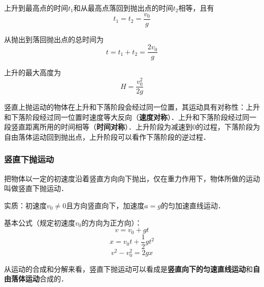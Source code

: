 上升到最高点的时间$t_1$和从最高点落回到抛出点的时间$t_2$相等，且有
\begin{equation}
t_1=t_2=\frac{v_0}{g}
\end{equation}

从抛出到落回抛出点的总时间为
\begin{equation}
t=t_1+t_2=\frac{2v_0}{g}
\end{equation}

上升的最大高度为
\begin{equation}
H=\frac{v_0^2}{2g}
\end{equation}

竖直上抛运动的物体在上升和下落阶段会经过同一位置，其运动具有对称性：上升和下落阶段经过同一位置时速度等大反向（\textbf{速度对称}）．上升和下落阶段经过同一段竖直距离所用的时间相等（\textbf{时间对称}）．上升阶段为减速到0的过程，下落阶段为自由落体运动回到抛出点，上升阶段可以看作下落阶段的逆过程．

\subsubsection{竖直下抛运动}
把物体以一定的初速度沿着竖直方向向下抛出，仅在重力作用下，物体所做的运动叫做竖直下抛运动．

实质：初速度$v_0\neq0$且方向竖直向下，加速度$a=g$的匀加速直线运动．

基本公式（规定初速度$v_0$的方向为正方向）：
\begin{equation}
v=v_0+gt
\end{equation}
\begin{equation}
x=v_0t+\frac12gt^2
\end{equation}
\begin{equation}
v^2-v_0^2=2gx
\end{equation}

从运动的合成和分解来看，竖直下抛运动可以看成是\textbf{竖直向下的匀速直线运动}和\textbf{自由落体运动}合成的．